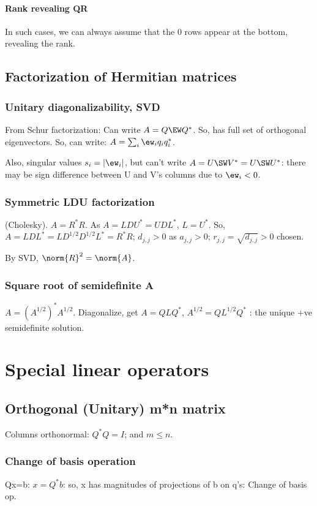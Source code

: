 \documentclass[oneside, article]{memoir}
\begin{document}
\subsubsection{Rank revealing QR}
In such cases, we can always assume that the 0 rows appear at the bottom, revealing the rank.

\section{Factorization of Hermitian matrices}
\subsection{Unitary diagonalizability, SVD}
From Schur factorization: Can write $A=Q \EW Q^{*}$. So, has full set of orthogonal eigenvectors. So, can write: $A = \sum_i \ew_i q_i q_i^{*}$.

Also, singular values $s_{i}= |\ew_{i}|$, but can't write $A = U \SW V^{*} = U \SW U^{*}$: there may be sign difference between U and V's columns due to $\ew_i < 0$.

\subsection{Symmetric LDU factorization}
(Cholesky). $A = R^{*}R$. As $A = LDU^{*}=UDL^{*}$, $L=U^{*}$. So, $A = LDL^{*} = LD^{1/2}D^{1/2}L^{*} = R^{*}R$; $d_{j,j} > 0$ as $a_{j,j}>0$; $r_{j,j} = \sqrt{d_{j,j}} >0$ chosen.

By SVD, $\norm{R}^{2} = \norm{A}$.

\subsection{Square root of semidefinite A}
$A = (A^{1/2})^{*}A^{1/2}$. Diagonalize, get $A = QLQ^{*}$, $A^{1/2} = QL^{1/2}Q^{*}$ : the unique +ve semidefinite solution.

\chapter{Special linear operators}
\section{Orthogonal (Unitary) m*n matrix}
Columns orthonormal: $Q^{*}Q=I$; and $m \leq n$.

\subsection{Change of basis operation}
Qx=b: $x=Q^{*}b$: so, x has magnitudes of projections of b on q's: Change of basis op.
\end{document}
